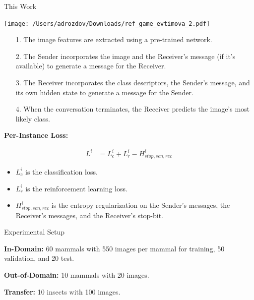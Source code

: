 \documentclass[final]{beamer}
\newlength{\onecolwid}
\begin{document}
\begin{frame}[t]
\begin{columns}[t]
\begin{column}{\onecolwid}
\begin{block}{This Work}

\begin{center}
\texttt{[image: /Users/adrozdov/Downloads/ref\_game\_evtimova\_2.pdf]}
\end{center}

\begin{enumerate}
\item[1.] The image features are extracted using a pre-trained network.
\item[2.] The Sender incorporates the image and the Receiver's message (if it's available) to generate a message for the Receiver.
\item[3.] The Receiver incorporates the class descriptors, the Sender's message, and its own hidden state to generate a message for the Sender.
\item[4.] When the conversation terminates, the Receiver predicts the image's most likely class.
\end{enumerate}

\vspace{22mm}

\textbf{Per-Instance Loss:}

\begin{align*}
L^i &= L^i_{c} + L^i_{r} - H^i_{stop,sen,rec}
\end{align*}

\begin{itemize}
\item $L^i_{c}$ is the classification loss.
\item $L^i_{r}$ is the reinforcement learning loss.
\item $H^i_{stop,sen,rec}$ is the entropy regularization on the Sender's messages, the Receiver's messages, and the Receiver's stop-bit.
\end{itemize}

\end{block}

\begin{block}{Experimental Setup}

\textbf{In-Domain:} 60 mammals with 550 images per mammal for training, 50 validation, and 20 test.

\textbf{Out-of-Domain:} 10 mammals with 20 images.

\textbf{Transfer:} 10 insects with 100 images.

\end{block}


\end{column}
\end{columns}
\end{frame}
\end{document}

